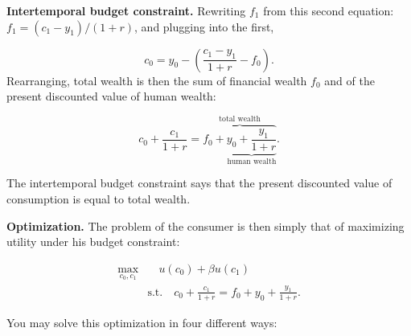 \documentclass[]{book}
\theoremstyle{definition}
\theoremstyle{definition}
\theoremstyle{definition}
\theoremstyle{remark}
\begin{document}
\textbf{Intertemporal budget constraint.} Rewriting \(f_{1}\) from this
second equation: \(f_{1}=(c_{1}-y_{1})/(1+r)\), and plugging into the
first,

\[c_{0}=y_{0}-\left(\frac{c_{1}-y_{1}}{1+r}-f_{0}\right).\] Rearranging,
total wealth is then the sum of financial wealth \(f_0\) and of the
present discounted value of human wealth:

\[c_{0}+\frac{c_{1}}{1+r}=\overbrace{f_{0}+\underbrace{y_{0}+\frac{y_{1}}{1+r}}_{\text{human wealth}}}^{\text{total wealth}}.\]

The intertemporal budget constraint says that the present discounted
value of consumption is equal to total wealth.

\textbf{Optimization.} The problem of the consumer is then simply that
of maximizing utility under his budget constraint:

\[
\begin{aligned} 
\max_{c_{0},c_{1}} & \quad u(c_{0})+\beta u(c_{1}) \\
& \text{s.t.} \quad c_{0}+\frac{c_{1}}{1+r}=f_{0}+y_{0}+\frac{y_{1}}{1+r}.
\end{aligned}
\]

You may solve this optimization in four different ways:
\end{document}
